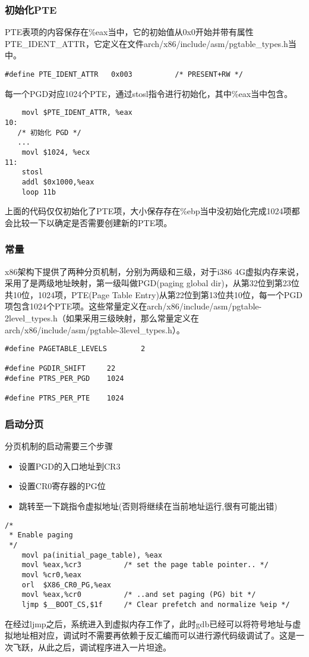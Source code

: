 \documentclass[b5paper,9pt,twoside,openany]{article}
\begin{document}
\subsubsection{初始化PTE}
PTE表项的内容保存在\%eax当中，它的初始值从0x0开始并带有属性PTE\_IDENT\_ATTR，它定义在文件arch/x86/include/asm/pgtable\_types.h当中。
\begin{lstlisting}
#define PTE_IDENT_ATTR   0x003          /* PRESENT+RW */
\end{lstlisting}

每一个PGD对应1024个PTE，通过stosl指令进行初始化，其中\%eax当中包含。
\begin{lstlisting}
    movl $PTE_IDENT_ATTR, %eax
10:
   /* 初始化 PGD */
   ...
    movl $1024, %ecx
11:
    stosl
    addl $0x1000,%eax
    loop 11b
\end{lstlisting}
上面的代码仅仅初始化了PTE项，大小保存存在\%ebp当中没初始化完成1024项都会比较一下以确定是否需要创建新的PTE项。

\subsubsection{常量}
x86架构下提供了两种分页机制，分别为两级和三级，对于i386 4G虚拟内存来说，采用了是两级地址映射，第一级叫做PGD(paging global dir)，从第32位到第23位共10位，1024项，PTE(Page Table Entry)从第22位到第13位共10位，每一个PGD项包含1024个PTE项。这些常量定义在arch/x86/include/asm/pgtable-2level\_types.h（如果采用三级映射，那么常量定义在arch/x86/include/asm/pgtable-3level\_types.h）。
\begin{lstlisting}
#define PAGETABLE_LEVELS        2

#define PGDIR_SHIFT     22
#define PTRS_PER_PGD    1024

#define PTRS_PER_PTE    1024
\end{lstlisting}

\subsubsection{启动分页}
分页机制的启动需要三个步骤
\begin{itemize}
\item 设置PGD的入口地址到CR3
\item 设置CR0寄存器的PG位
\item 跳转至一下跳指令虚拟地址(否则将继续在当前地址运行,很有可能出错)
\end{itemize}
\begin{lstlisting}
/*
 * Enable paging
 */
    movl pa(initial_page_table), %eax
    movl %eax,%cr3          /* set the page table pointer.. */
    movl %cr0,%eax
    orl  $X86_CR0_PG,%eax
    movl %eax,%cr0          /* ..and set paging (PG) bit */
    ljmp $__BOOT_CS,$1f     /* Clear prefetch and normalize %eip */
\end{lstlisting}
在经过ljmp之后，系统进入到虚拟内存工作了，此时gdb已经可以将符号地址与虚拟地址相对应，调试时不需要再依赖于反汇编而可以进行源代码级调试了。这是一次飞跃，从此之后，调试程序进入一片坦途。
\end{document}
